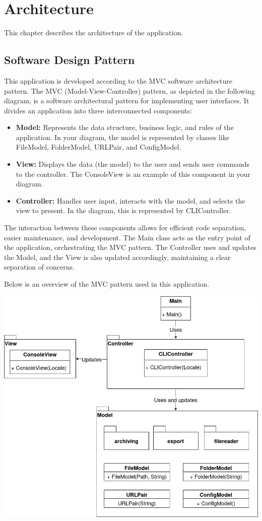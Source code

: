 \section{Architecture}
This chapter describes the architecture of the application. 

\subsection{Software Design Pattern}
This application is developed according to the MVC software architecture pattern. 
The MVC (Model-View-Controller) pattern, as depicted in the following diagram, is a software architectural pattern for implementing user interfaces. It divides an application into three interconnected components:

\begin{itemize}
    \item \textbf{Model:} Represents the data structure, business logic, and rules of the application. In your diagram, the model is represented by classes like FileModel, FolderModel, URLPair, and ConfigModel.
    \item \textbf{View:} Displays the data (the model) to the user and sends user commands to the controller. The ConsoleView is an example of this component in your diagram.
    \item \textbf{Controller:} Handles user input, interacts with the model, and selects the view to present. In the diagram, this is represented by CLIController.
    
\end{itemize}

The interaction between these components allows for efficient code separation, easier maintenance, and development. The Main class acts as the entry point of the application, orchestrating the MVC pattern. The Controller uses and updates the Model, and the View is also updated accordingly, maintaining a clear separation of concerns.

Below is an overview of the MVC pattern used in this application.

\includegraphics[width=1\textwidth]{diagrams/mvc_diagram-Highlevel_MVC.png}
\clearpage

